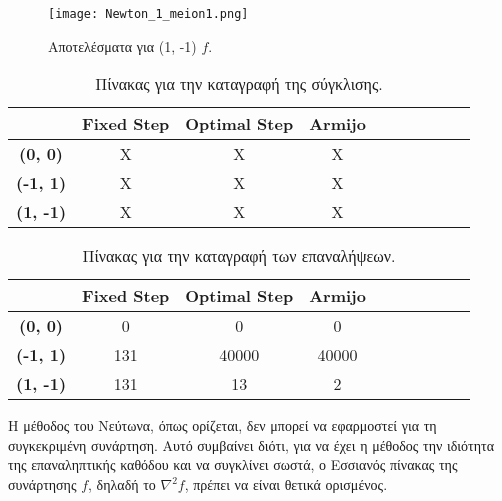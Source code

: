 \documentclass[a4paper,12pt]{report}
\newcommand{\en}{\selectlanguage{english}}
\newcommand{\gr}{\selectlanguage{greek}}
\begin{document}
\begin{figure}[ht!]
    \centering
    \texttt{[image: Newton\_1\_meion1.png]} 
    \caption{Αποτελέσματα για (1, -1) \(f\).}
\end{figure}

\clearpage

\begin{table}[H]
\centering
\renewcommand{\arraystretch}{2} %
\setlength{\tabcolsep}{12pt} %
\begin{tabular}{|c|c|c|c|c|c|c|c|c|c|}
\hline
& \textbf{\en Fixed Step\gr} & \textbf{\en Optimal Step\gr} & \textbf{\en Armijo \gr} \\ \hline
\en
\textbf{(0, 0)} &Χ   &Χ   &Χ  \\ \hline
\textbf{(-1, 1)} &\en X   &\en X   &\en X  \\ \hline
\textbf{(1, -1)} &Χ   &\en X   &\en X  \\ \hline
\end{tabular}
\caption{Πίνακας για την καταγραφή της σύγκλισης.}
\label{tab:large2_convergence}
\end{table}

\begin{table}[H]
\centering
\renewcommand{\arraystretch}{2} %
\setlength{\tabcolsep}{12pt} %
\begin{tabular}{|c|c|c|c|c|c|c|c|c|c|}
\hline
& \textbf{\en Fixed Step\gr} & \textbf{\en Optimal Step\gr} & \textbf{\en Armijo \gr} \\ \hline
\en
\textbf{(0, 0)} &0   &0   &0  \\ \hline
\textbf{(-1, 1)} &131   &40000   &40000  \\ \hline
\textbf{(1, -1)} &131   &13   &2  \\ \hline
\end{tabular}
\caption{Πίνακας για την καταγραφή των επαναλήψεων.}
\label{tab:large2_iterations}
\end{table}

\hspace{-0.6cm}Η μέθοδος του Νεύτωνα, όπως ορίζεται, δεν μπορεί να εφαρμοστεί για τη συγκεκριμένη συνάρτηση. Αυτό συμβαίνει διότι, για να έχει η μέθοδος την ιδιότητα της επαναληπτικής καθόδου και να συγκλίνει σωστά, ο Εσσιανός πίνακας της συνάρτησης \( f \), δηλαδή το \( \nabla^2 f \), πρέπει να είναι θετικά ορισμένος. 

\vspace{0.5cm}
\end{document}
